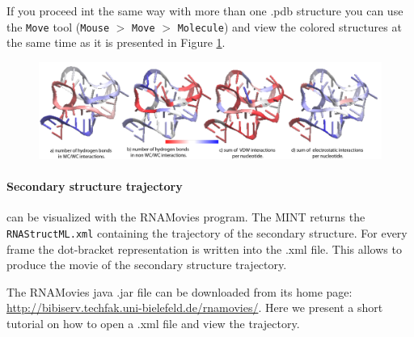 \documentclass[12pt]{article}
\begin{document}
If you proceed int the same way with more than one .pdb structure you can use the \texttt{Move} tool (\texttt{Mouse} $>$ \texttt{Move} $>$ \texttt{Molecule}) and view the colored structures at the same time as it is presented in Figure \ref{3Ddifferent}.

\begin{figure}[h!]
\centering
\label{3Ddifferent}
\includegraphics[scale=0.65]{./pictures/3D_different.png}
\end{figure}

\paragraph{Secondary structure trajectory} can be visualized with the RNAMovies \cite{Evers1999} program. The MINT returns the \texttt{RNAStructML.xml} containing the trajectory of the secondary structure. For every frame the dot-bracket representation is written into the .xml file. This allows to produce the movie of the secondary structure trajectory. 

The RNAMovies \cite{Evers1999}  java .jar file can be downloaded from its home page: \url{http://bibiserv.techfak.uni-bielefeld.de/rnamovies/}. Here we present a short tutorial on how to open a .xml file and view the trajectory.
\end{document}
